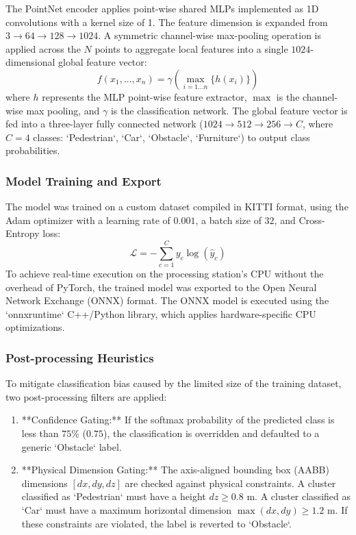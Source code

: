 \documentclass[a4paper,twocolumn]{article}
\begin{document}
The PointNet encoder applies point-wise shared MLPs implemented as 1D convolutions with a kernel size of 1. The feature dimension is expanded from $3 \rightarrow 64 \rightarrow 128 \rightarrow 1024$. A symmetric channel-wise max-pooling operation is applied across the $N$ points to aggregate local features into a single $1024$-dimensional global feature vector:
\begin{equation}\label{eq:symmetric}
f(x_1, ..., x_n) = \gamma \left( \max_{i=1...n} \{ h(x_i) \} \right)
\end{equation}
where $h$ represents the MLP point-wise feature extractor, $\max$ is the channel-wise max pooling, and $\gamma$ is the classification network. The global feature vector is fed into a three-layer fully connected network ($1024 \rightarrow 512 \rightarrow 256 \rightarrow C$, where $C=4$ classes: `Pedestrian`, `Car`, `Obstacle`, `Furniture`) to output class probabilities.

\subsubsection{Model Training and Export}
The model was trained on a custom dataset compiled in KITTI format, using the Adam optimizer with a learning rate of $0.001$, a batch size of $32$, and Cross-Entropy loss:
\begin{equation}\label{eq:loss}
\mathcal{L} = -\sum_{c=1}^{C} y_c \log(\hat{y}_c)
\end{equation}
To achieve real-time execution on the processing station's CPU without the overhead of PyTorch, the trained model was exported to the Open Neural Network Exchange (ONNX) format. The ONNX model is executed using the `onnxruntime` C++/Python library, which applies hardware-specific CPU optimizations.

\subsubsection{Post-processing Heuristics}
To mitigate classification bias caused by the limited size of the training dataset, two post-processing filters are applied:
\begin{enumerate}
    \item **Confidence Gating:** If the softmax probability of the predicted class is less than $75\%$ ($0.75$), the classification is overridden and defaulted to a generic `Obstacle` label.
    \item **Physical Dimension Gating:** The axis-aligned bounding box (AABB) dimensions $[dx, dy, dz]$ are checked against physical constraints. A cluster classified as `Pedestrian` must have a height $dz \ge 0.8\text{ m}$. A cluster classified as `Car` must have a maximum horizontal dimension $\max(dx, dy) \ge 1.2\text{ m}$. If these constraints are violated, the label is reverted to `Obstacle`.
\end{enumerate}
\end{document}
